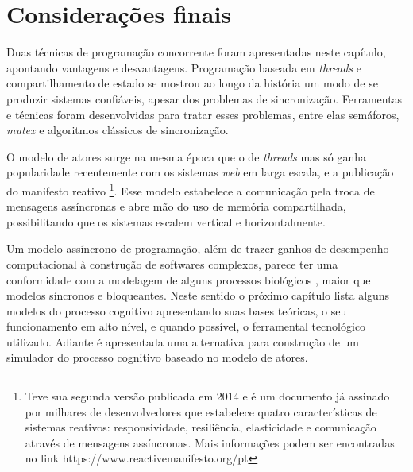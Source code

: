 \section{Considerações finais}
Duas técnicas de programação concorrente foram apresentadas neste capítulo, apontando vantagens e desvantagens. Programação baseada em \textit{threads} e compartilhamento de estado se mostrou ao longo da história um modo de se produzir sistemas confiáveis, apesar dos problemas de sincronização. Ferramentas e técnicas foram desenvolvidas para tratar esses problemas, entre elas semáforos, \textit{mutex} e algoritmos clássicos de sincronização. 

O modelo de atores surge na mesma época que o de \textit{threads} mas só ganha popularidade recentemente com os sistemas \textit{web} em larga escala, e a publicação do manifesto reativo \footnote{Teve sua segunda versão publicada em 2014 e é um documento já assinado por milhares de desenvolvedores que estabelece quatro características de sistemas reativos: responsividade, resiliência, elasticidade e comunicação através de mensagens assíncronas. Mais informações podem ser encontradas no link https://www.reactivemanifesto.org/pt}. Esse modelo estabelece a comunicação pela troca de mensagens assíncronas e abre mão do uso de memória compartilhada, possibilitando que os sistemas escalem vertical e horizontalmente. 

Um modelo assíncrono de programação, além de trazer ganhos de desempenho computacional à construção de softwares complexos, parece ter uma conformidade com a modelagem de alguns processos biológicos \cite{Strombom2017, Fisher2008, Wang2016}, maior que modelos síncronos e bloqueantes. Neste sentido o próximo capítulo lista alguns modelos do processo cognitivo apresentando suas bases teóricas, o seu funcionamento em alto nível, e quando possível, o ferramental tecnológico utilizado. Adiante é apresentada uma alternativa para construção de um simulador do processo cognitivo baseado no modelo de atores.